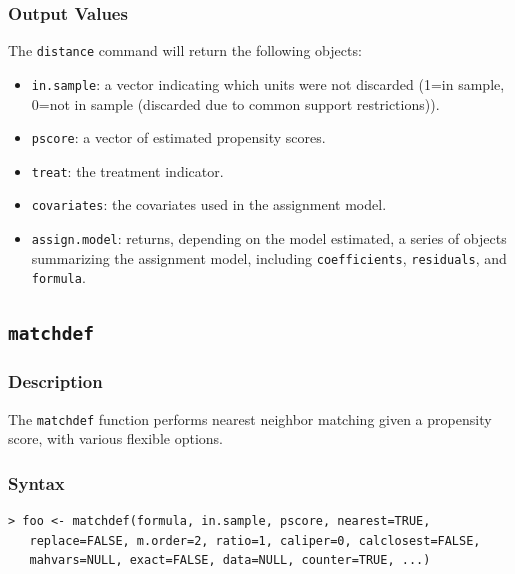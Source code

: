 \documentclass[oneside,letterpaper,titlepage]{article}
\begin{document}
\begin{appendix}
\subsubsection{Output Values}
The \texttt{distance} command will return the following objects:
\begin{itemize}
\item \texttt{in.sample}: a vector indicating which units were not discarded
  (1=in sample, 0=not in sample (discarded due to common support
  restrictions)).
\item \texttt{pscore}: a vector of estimated propensity scores. 
\item \texttt{treat}: the treatment indicator.
\item \texttt{covariates}: the covariates used in the
  assignment model.
\item \texttt{assign.model}: returns, depending on the model estimated, a 
  series of objects summarizing the assignment model, including
  \texttt{coefficients}, \texttt{residuals},
  and \texttt{formula}. 
\end{itemize}

\subsection{\texttt{matchdef}}
\subsubsection{Description}
The \texttt{matchdef} function performs nearest neighbor matching
given a propensity score, with various flexible options. 

\subsubsection{Syntax}
\begin{verbatim}
> foo <- matchdef(formula, in.sample, pscore, nearest=TRUE,
   replace=FALSE, m.order=2, ratio=1, caliper=0, calclosest=FALSE,
   mahvars=NULL, exact=FALSE, data=NULL, counter=TRUE, ...)
\end{verbatim}


\end{appendix}
\end{document}

